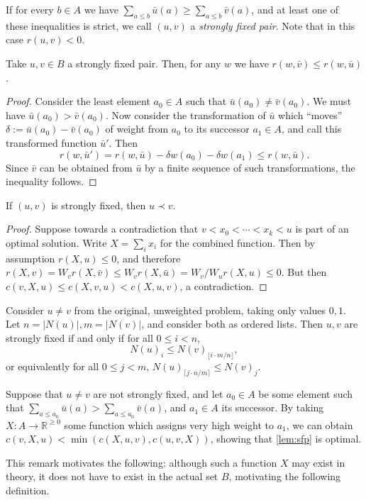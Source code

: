 \documentclass[a4paper,UKenglish,cleveref, autoref, thm-restate]{lipics-v2021}
\renewcommand{\b}{\prec}
\begin{document}
\begin{definition}
    If for every $b \in A$ we have $\sum_{a \leq b} \bar u(a) \geq \sum_{a
    \leq b} \bar v(a)$, and at least one of these inequalities is strict, we call $(u, v)$ a
    \emph{strongly fixed pair}. Note that in this case $r(u, v) < 0$.
\end{definition}
\begin{lemma}\label{lem:sfp} Take $u, v \in B$ a strongly fixed pair.
    Then, for any $w$ we have $r(w, \bar v) \leq r(w, \bar u)$.
\end{lemma}
\begin{proof}
    Consider the least element $a_0 \in A$ such that $\bar u(a_0) \neq
    \bar v(a_0)$. We must have $\bar u(a_0) > \bar v(a_0)$. Now consider the transformation of
    $\bar u$ which ``moves'' $\delta := \bar u(a_0) - \bar v(a_0)$ of weight from $a_0$ to its
    successor $a_1 \in A$, and call this transformed function $\bar u'$. Then
    \[
        r(w, \bar u') = r(w, \bar u) - \delta w(a_0) - \delta w(a_1) \leq r(w, \bar u).
    \]
    Since $\bar v$ can be obtained from $\bar u$ by a finite sequence of such transformations,
    the inequality follows.
\end{proof}
\begin{lemma}
    If $(u, v)$ is strongly fixed, then $u \b v$.
\end{lemma}
\begin{proof}
    Suppose towards a contradiction that $v < x_0 < \cdots < x_k < u$ is part of an optimal
    solution. Write $X = \sum_i x_i$ for the combined function. Then by assumption $r(X, u)
    \leq 0$, and therefore $r(X, v) = W_v r(X, \bar v) \leq W_v r(X, \bar u) = W_v / W_u r(X,
    u) \leq 0$. But then $c(v, X, u) \leq c(X, v, u) < c(X, u, v)$, a contradiction.
\end{proof}

\begin{remark}
    Consider $u \neq v$ from the original, unweighted problem, taking only values $0, 1$. Let 
    $n = |N(u)|, m = |N(v)|$, and consider both as ordered lists. Then $u, v$ are strongly
    fixed if and only if for all $0 \leq i < n$,
    \[
        N(u)_i \leq N(v)_{\lfloor i\cdot m/n \rfloor},
    \]
    or equivalently for all $0 \leq j < m$, $N(u)_{\lceil j\cdot n/m \rceil} \leq N(v)_j$.
\end{remark}

\begin{remark}
    Suppose that $u \neq v$ are not strongly fixed, and let $a_0 \in A$ be some element such
    that $\sum_{a \leq a_0} \bar u(a) > \sum_{a \leq a_0} \bar v(a)$, and $a_1 \in A$ its
    successor. By taking $X: A \to \mathbb R^{\geq 0}$ some function which assigns very high
    weight to $a_1$, we can obtain $c(v, X, u) < \min(c(X, u, v), c(u, v, X))$, showing that
    \ref{lem:sfp} is optimal.
\end{remark}
This remark motivates the following: although such a function $X$ may exist in theory, it does
not have to exist in the actual set $B$, motivating the following definition.
\end{document}
